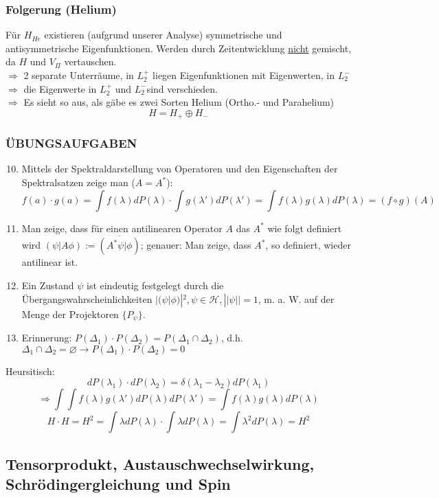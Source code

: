\documentclass[twoside,a4paper]{scrartcl}
\renewcommand{\1}{\mathds{1}}
\newcommand{\Ra}{\Rightarrow}
\newcommand{\ra}{\rightarrow}
\renewcommand{\l}{\lambda}
\renewcommand{\H}{\mathcal{H}}
\begin{document}
\subsubsection*{Folgerung (Helium)}
Für $H_{He}$ existieren (aufgrund unserer Analyse) symmetrische und antisymmetrische Eigenfunktionen. Werden durch Zeitentwicklung \underline{nicht} gemischt, da $H$ und $V_\Pi$ vertauschen.\\
$\Ra$ 2 separate Unterräume, in $L_2^+$ liegen Eigenfunktionen mit Eigenwerten, in $L_2^-$\\
$\Ra$ die Eigenwerte in $L_2^+$ und $L_2^-$sind verschieden.\\
$\Ra$ Es sieht so aus, als gäbe es zwei Sorten Helium (Ortho.- und Parahelium)\\
$$H=H_+ \oplus H_-$$
\subsubsection*{ÜBUNGSAUFGABEN}
\begin{enumerate}
\setcounter{enumi}{9}
\item Mittels der Spektraldarstellung von Operatoren und den Eigenschaften der Spektralsatzen zeige man ($A=A^*$):\\
$$f(a) \cdot g(a)=\int f(\l) dP(\l) \cdot \int g(\l') dP(\l')=\int f(\l) g(\l) dP(\l)=(f \circ g)(A)$$
\item Man zeige, dass für einen antilinearen Operator $A$ das $A^*$ wie folgt definiert wird $(\psi|A\phi):=\overline{(A^*\psi|\phi)}$; genauer: Man zeige, dass $A^*$, so definiert, wieder antilinear ist.
\item Ein Zustand $\psi$ ist eindeutig festgelegt durch die Übergangswahrscheinlichkeiten $|(\psi|\phi)|^2, \psi \in \H, ||\psi||=1$, m. a. W. auf der Menge der Projektoren $\{P_\psi\}$.
\item Erinnerung: $P(\Delta_1)\cdot P(\Delta_2)=P(\Delta_1 \cap \Delta_2)$, d.h. $\Delta_1 \cap \Delta_2=\varnothing \ra P(\Delta_1)\cdot P(\Delta_2)=0$
\end{enumerate}
Heursitisch:
$$dP(\l_1)\cdot dP(\l_2)=\delta(\l_1-\l_2)dP(\l_1)$$
$$\Ra \int \int f(\l) g(\l') dP(\l)dP(\l')=\int f(\l)g(\l) dP(\l)$$
$$H\cdot H=H^2=\int \l dP(\l)\cdot \int \l dP(\l)=\int \l^2 dP(\l)=H^2$$
\subsection{Tensorprodukt, Austauschwechselwirkung, Schrödingergleichung und Spin}
\end{document}
